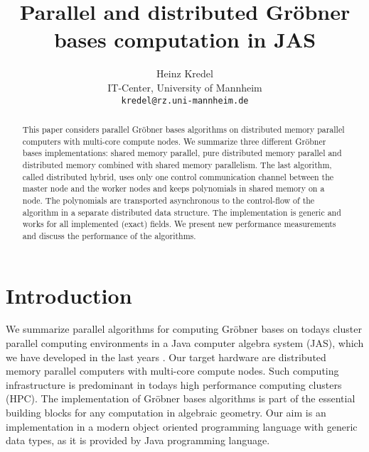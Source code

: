 \documentclass[10pt,twocolumn,a4paper]{article}
\newcommand{\code}[1]{\texttt{#1}}
\begin{document}
\title{Parallel and distributed Gr\"obner bases computation in JAS}


\author{Heinz Kredel\\
{\small IT-Center, University of Mannheim}\\
\code{kredel@rz.uni-mannheim.de}
}

\def\today{18. July 2010}

\maketitle
\thispagestyle{empty}

\begin{abstract} 
  This paper considers parallel Gr\"obner bases algorithms on
  distributed memory parallel computers with multi-core compute nodes.
  We summarize three different Gr\"obner bases implementations: shared
  memory parallel, pure distributed memory parallel and distributed
  memory combined with shared memory parallelism.  The last algorithm,
  called distributed hybrid, uses only one control communication
  channel between the master node and the worker nodes and keeps
  polynomials in shared memory on a node. The polynomials are
  transported asynchronous to the control-flow of the algorithm in a
  separate distributed data structure.  The implementation is generic
  and works for all implemented (exact) fields.  We present new
  performance measurements and discuss the performance of the
  algorithms.
\end{abstract}








\section{Introduction} 



We summarize parallel algorithms for computing Gr\"obner bases on
todays cluster parallel computing environments in a Java computer
algebra system (JAS), which we have developed in the last years
\cite{Kredel:2009,Kredel:2010}.  Our target hardware are distributed
memory parallel computers with multi-core compute nodes.  Such
computing infrastructure is predominant in todays high performance
computing clusters (HPC).  The implementation of Gr\"obner bases
algorithms is part of the essential building blocks for any
computation in algebraic geometry.  Our aim is an implementation in a
modern object oriented programming language with generic data types,
as it is provided by Java programming language.
\end{document}
